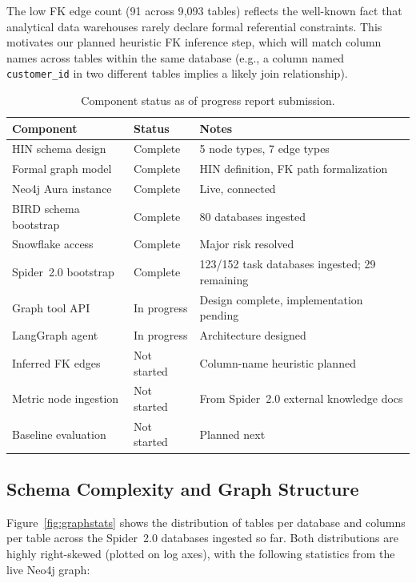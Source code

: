 \documentclass[11pt]{article}
\begin{document}
The low FK edge count (91 across 9{,}093 tables) reflects the well-known fact that analytical data warehouses rarely declare formal referential constraints.
This motivates our planned heuristic FK inference step, which will match column names across tables within the same database (e.g., a column named \texttt{customer\_id} in two different tables implies a likely join relationship).

\begin{table}[h]
\centering
\begin{tabular}{lll}
\toprule
\textbf{Component} & \textbf{Status} & \textbf{Notes} \\
\midrule
HIN schema design        & Complete     & 5 node types, 7 edge types \\
Formal graph model       & Complete     & HIN definition, FK path formalization \\
Neo4j Aura instance      & Complete     & Live, connected \\
BIRD schema bootstrap    & Complete     & 80 databases ingested \\
Snowflake access         & Complete     & Major risk resolved \\
Spider~2.0 bootstrap     & Complete     & 123/152 task databases ingested; 29 remaining \\
Graph tool API           & In progress  & Design complete, implementation pending \\
LangGraph agent          & In progress  & Architecture designed \\
Inferred FK edges        & Not started  & Column-name heuristic planned \\
Metric node ingestion    & Not started  & From Spider~2.0 external knowledge docs \\
Baseline evaluation      & Not started  & Planned next \\
\bottomrule
\end{tabular}
\caption{Component status as of progress report submission.}
\label{tab:status}
\end{table}

\subsection{Schema Complexity and Graph Structure}

Figure~\ref{fig:graphstats} shows the distribution of tables per database and columns per table across the Spider~2.0 databases ingested so far.
Both distributions are highly right-skewed (plotted on log axes), with the following statistics from the live Neo4j graph:
\end{document}
